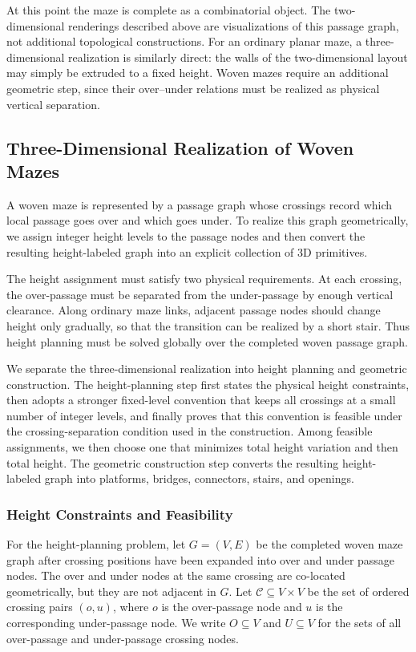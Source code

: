 \documentclass[acmsmall,screen,nonacm]{acmart}
\begin{document}
At this point the maze is complete as a combinatorial object. The
two-dimensional renderings described above are visualizations of this
passage graph, not additional topological constructions. For an
ordinary planar maze, a three-dimensional realization is similarly
direct: the walls of the two-dimensional layout may simply be extruded
to a fixed height. Woven mazes require an additional geometric step,
since their over--under relations must be realized as physical
vertical separation.

\subsection{Three-Dimensional Realization of Woven Mazes}

A woven maze is represented by a passage graph whose crossings record
which local passage goes over and which goes under. To realize this
graph geometrically, we assign integer height levels to the passage
nodes and then convert the resulting height-labeled graph into an
explicit collection of 3D primitives.

The height assignment must satisfy two physical requirements. At each
crossing, the over-passage must be separated from the under-passage by
enough vertical clearance. Along ordinary maze links, adjacent passage
nodes should change height only gradually, so that the transition can
be realized by a short stair. Thus height planning must be solved
globally over the completed woven passage graph.

We separate the three-dimensional realization into height planning and
geometric construction. The height-planning step first states the
physical height constraints, then adopts a stronger fixed-level
convention that keeps all crossings at a small number of integer
levels, and finally proves that this convention is feasible under the
crossing-separation condition used in the construction. Among feasible
assignments, we then choose one that minimizes total height variation
and then total height. The geometric construction step converts the
resulting height-labeled graph into platforms, bridges, connectors,
stairs, and openings.

\subsubsection{Height Constraints and Feasibility}

For the height-planning problem, let \(G=(V,E)\) be the completed
woven maze graph after crossing positions have been expanded into over
and under passage nodes. The over and under nodes at the same crossing
are co-located geometrically, but they are not adjacent in \(G\). Let
\(\mathcal{C}\subseteq V\times V\) be the set of ordered crossing
pairs \((o,u)\), where \(o\) is the over-passage node and \(u\) is the
corresponding under-passage node. We write \(O\subseteq V\) and
\(U\subseteq V\) for the sets of all over-passage and under-passage
crossing nodes.
\end{document}
